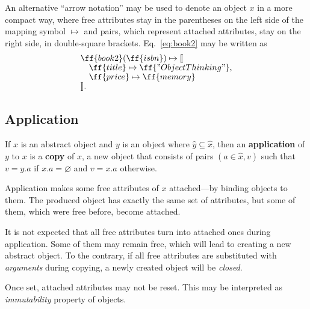 An alternative ``arrow notation'' may be used to denote an object \(x\) in a more
compact way, where free attributes stay in the parentheses on the left side of the
mapping symbol \(\mapsto\) and pairs,
which represent attached attributes, stay on the right side, in double-square brackets.
Eq.~\ref{eq:book2} may be written as
\begin{equation}\label{eq:book2-compact}
\begin{split}
& \ff{book2}(\ff{isbn}) \mapsto \llbracket \br
& \quad \ff{title} \mapsto \ff{"Object Thinking"}, \br
& \quad \ff{price} \mapsto \ff{memory} \br
& \rrbracket. \\
\end{split}
\end{equation}

\subsection{Application}

\begin{definition}\label{def:application}
If \(x\) is an abstract object and \(y\) is an object
  where \(\hat{y}\subseteq\hat{x}\),
  then an \textbf{application} of \(y\) to \(x\) is
  a \textbf{copy} of \(x\), a new object that consists of pairs \((a\in\hat{x},v)\) such that
  \(v=y.a\) if \(x.a=\varnothing\) and \(v=x.a\) otherwise.
\end{definition}

Application makes some free attributes of \(x\) attached---by binding objects to them.
The produced object has exactly the same set of attributes, but some of them,
which were free before, become attached.

It is not expected that all free attributes turn into attached ones during application.
Some of them may remain free, which will lead
to creating a new abstract object. To the contrary,
if all free attributes are substituted with \emph{arguments} during copying,
a newly created object will be \emph{closed}.

Once set, attached attributes may not be reset.
This may be interpreted as \emph{immutability} property of objects.

